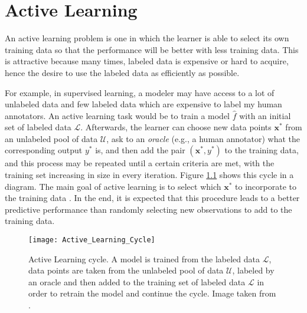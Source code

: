 
\chapter{Active Learning}
\label{ch:active_learning}



An active learning problem is one in which the learner is able to select its own training data so that the performance will be better with less training data. This is attractive because many times, labeled data is expensive or hard to acquire, hence the desire to use the labeled data as efficiently as possible.

For example, in supervised learning, a modeler may have access to a lot of unlabeled data and few labeled data which are expensive to label my human annotators. An active learning task would be to train a model $\hat{f}$ with an initial set of labeled data $\mathcal{L}$. Afterwards, the learner can choose new data points $\boldsymbol{x}^*$ from an unlabeled pool of data $\mathcal{U}$, ask to an \textit{oracle} (e.g., a human annotator) what the corresponding output $y^*$ is, and then add the pair $(\boldsymbol{x}^*, {y}^*)$ to the training data, and this process may be repeated until a certain criteria are met, with the training set increasing in size in every iteration. Figure \ref{fig:Active_Learning_Cycle} shows this cycle in a diagram. The main goal of active learning is to select which $\boldsymbol{x}^*$ to incorporate to the training data \cite{cohn1996active}. In the end, it is expected that this procedure leads to a better predictive performance than randomly selecting new observations to add to the training data.

\begin{figure}[H]
    \centering
    \texttt{[image: Active\_Learning\_Cycle]}
    \caption{Active Learning cycle. A model is trained from the labeled data $\mathcal{L}$, data points are taken from the unlabeled pool of data $\mathcal{U}$, labeled by an oracle and then added to the training set of labeled data $\mathcal{L}$ in order to retrain the model and continue the cycle. Image taken from \cite{settles.tr09}.}
    \label{fig:Active_Learning_Cycle}
\end{figure}

